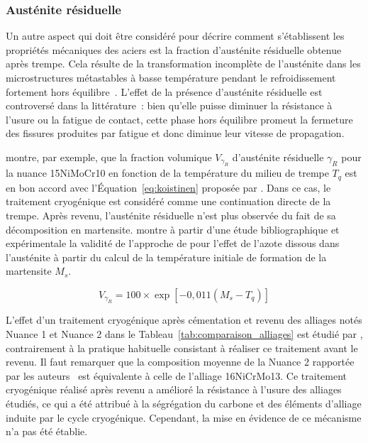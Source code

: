 \subsubsection*{Austénite résiduelle} 

Un autre aspect qui doit être considéré pour décrire comment s'établissent les propriétés mécaniques des aciers est la fraction d'austénite résiduelle obtenue après trempe. Cela résulte de la transformation incomplète de l'austénite dans les microstructures métastables à basse température pendant le refroidissement fortement hors équilibre~\cite{Steel2006}. L'effet de la présence d'austénite résiduelle est controversé dans la littérature~\cite{Preciado2006}: bien qu'elle puisse diminuer la résistance à l'usure ou la fatigue de contact, cette phase hors équilibre promeut la fermeture des fissures produites par fatigue et donc diminue leur vitesse de propagation.

\citet{Loukachenko2006} montre, par exemple, que la fraction volumique $V_{\gamma_{R}}$ d'austénite résiduelle $\gamma_{R}$ pour la nuance 15NiMoCr10 en fonction de la température du milieu de trempe $T_{q}$ est en bon accord avec l'Équation~\ref{eq:koistinen} proposée par \citet{Koistinen1959}. Dans ce cas, le traitement cryogénique est considéré comme une continuation directe de la trempe. Après revenu, l'austénite résiduelle n'est plus observée du fait de sa décomposition en martensite. \citet{Yahia1995} montre à partir d'une étude bibliographique et expérimentale la validité de l'approche de \citet{Koistinen1959} pour l'effet de l'azote dissous dans l'austénite à partir du calcul de la température initiale de formation de la martensite $M_{s}$.

\begin{equation}
  V_{\gamma_{R}}=100\times\exp[-0,011(M_{s}-T_{q})]
  \label{eq:koistinen}
\end{equation}

L'effet d'un traitement cryogénique après cémentation et revenu des alliages notés \og{}Nuance 1\fg{} et \og{}Nuance 2\fg{} dans le Tableau~\ref{tab:comparaison_alliages} est étudié par \citet{Preciado2006}, contrairement à la pratique habituelle consistant à réaliser ce traitement avant le revenu. Il faut remarquer que la composition moyenne de la \og{}Nuance 2\fg{} rapportée par les auteurs~\cite{Preciado2006} est équivalente à celle de l'alliage 16NiCrMo13. Ce traitement cryogénique réalisé après revenu a amélioré la résistance à l'usure des alliages étudiés, ce qui a été attribué à la ségrégation du carbone et des éléments d'alliage induite par le cycle cryogénique. Cependant, la mise en évidence de ce mécanisme n'a pas été établie.


